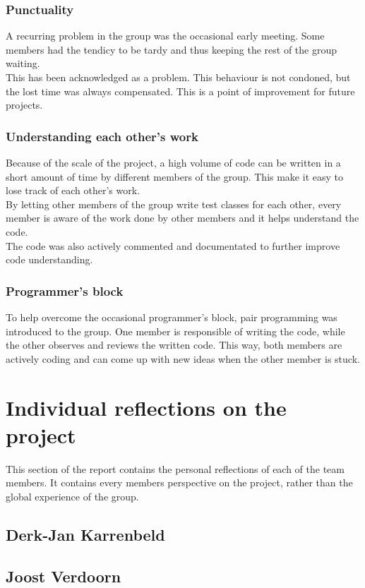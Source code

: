 \documentclass[10pt,a4paper]{report}
\begin{document}
			\subsubsection*{Punctuality}
				A recurring problem in the group was the occasional early meeting. Some members had the tendicy to be tardy and thus keeping the rest of the group waiting. \\
				This has been acknowledged as a problem. This behaviour is not condoned, but the lost time was always compensated. This is a point of improvement for future projects.
			\subsubsection*{Understanding each other's work}
				Because of the scale of the project, a high volume of code can be written in a short amount of time by different members of the group. This make it easy to lose track of each other's work. \\
				By letting other members of the group write test classes for each other, every member is aware of the work done by other members and it helps understand the code. \\
				The code was also actively commented and documentated to further improve code understanding.
			\subsubsection*{Programmer's block}
				To help overcome the occasional programmer's block, pair programming was introduced to the group. One member is responsible of writing the code, while the other observes and reviews the written code. This way, both members are actively coding and can come up with new ideas when the other member is stuck.

	\section{Individual reflections on the project}
		This section of the report contains the personal reflections of each of the team members. It contains every members perspective on the project, rather than the global experience of the group.
		\subsection{Derk-Jan Karrenbeld}
			
		\subsection{Joost Verdoorn}
			
\end{document}
